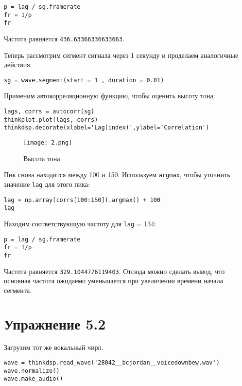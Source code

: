 \documentclass[a4paper,12pt]{report}
\begin{document}
\begin{lstlisting}[caption=Нахождение частоты]
p = lag / sg.framerate
fr = 1/p
fr
\end{lstlisting}

Частота равняется \texttt{436.63366336633663}.

Теперь рассмотрим сегмент сигнала через 1 секунду и проделаем аналогичные действия.

\begin{lstlisting}[caption=Второй сегмент]
sg = wave.segment(start = 1 , duration = 0.01)
\end{lstlisting}

Применим автокорреляционную функцию, чтобы оценить высоту тона:

\begin{lstlisting}[caption=Оценка высоты тона]
lags, corrs = autocorr(sg)
thinkplot.plot(lags, corrs)
thinkdsp.decorate(xlabel='Lag(index)',ylabel='Correlation')
\end{lstlisting}

\begin{figure}[H]
        \centering
        \texttt{[image: 2.png]}
        \caption{Высота тона}
        \label{fig:lab5_fig1_2}
\end{figure}

Пик снова находится между 100 и 150. Используем \texttt{argmax}, чтобы уточнить значение \texttt{lag} для этого пика:

\begin{lstlisting}[caption=Нахождение \texttt{lag}]
lag = np.array(corrs[100:150]).argmax() + 100
lag
\end{lstlisting}

Находим соответствующую частоту для \texttt{lag} = 134:

\begin{lstlisting}[caption=Нахождение частоты]
p = lag / sg.framerate
fr = 1/p
fr
\end{lstlisting}

Частота равняется \texttt{329.1044776119403}. Отсюда можно сделать вывод, что основная частота ожидаемо уменьшается при увеличении времени начала сегмента.

\chapter{Упражнение 5.2}

Загрузим тот же вокальный чирп.

\begin{lstlisting}[caption=Загрузка звука]
wave = thinkdsp.read_wave('28042__bcjordan__voicedownbew.wav')
wave.normalize()
wave.make_audio()
\end{lstlisting}
\end{document}
